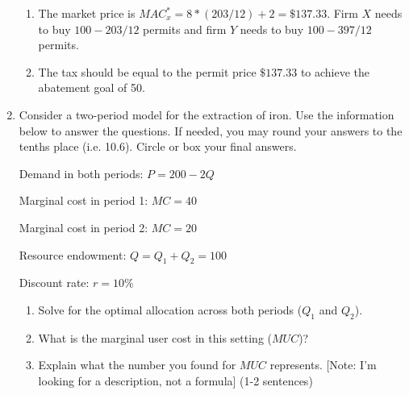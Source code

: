 \documentclass[11pt]{article}
\newcommand{\answer}[1]{\iftoggle{INCLUDEANSWERS}{{\color{violet!70!white}\textbf{Solution:} #1}}{}}
\newcommand{\points}[1]{\iftoggle{INCLUDEPOINTS}{{\color{blue!70!white}(#1 pts.)}}{}}
\begin{document}
\begin{enumerate}
{\begin{enumerate}
      \item The market price is $MAC_x^* = 8 * (203/12) + 2 = \$ 137.33$. Firm $X$ needs to buy $100 - 203/12$ permits and firm $Y$ needs to buy $100 - 397/12$ permits.
      
      \item The tax should be equal to the permit price $\$ 137.33$ to achieve the abatement goal of 50. 
    \end{enumerate}
  }

  \item Consider a two-period model for the extraction of iron. Use the information below to answer the questions. If needed, you may round your answers to the tenths place (i.e. 10.6). Circle or box your final answers.

  Demand in both periods: $P = 200 - 2Q$
  
  Marginal cost in period 1: $MC = 40$
  
  Marginal cost in period 2: $MC = 20$
  
  Resource endowment: $Q = Q_1 + Q_2 = 100$
  
  Discount rate: $r = 10\%$
  
  \begin{enumerate}
    \item \points{15} Solve for the optimal allocation across both periods ($Q_1$ and $Q_2$).
    \item \points{5} What is the marginal user cost in this setting ($MUC$)?
    \item \points{10} Explain what the number you found for $MUC$ represents. [Note: I’m looking for a description, not a formula] (1-2 sentences)  
  \end{enumerate}

  \answer{
    \begin{enumerate}
      \item $MNB_1 = 200 - 2Q_1 - 40 = 160 - 2Q_1$ and $PV(MNB_2) = \frac{200 - 2Q_2 - 20}{1.1} = 180/1.1 - 2/1.1 Q_2$
      
      Then, putting $160 - 2Q_1 = \frac{180 - 2 Q_2}{1.1}$ and $Q_1 + Q_2 = 100$ yields  
      $$
        160 - 2(100 - Q_2) = \frac{180 - 2 Q_2}{1.1}.
      $$
      Simplifying, we have
      $$
        -40 + 2Q_2 = \frac{180 - 2Q_2}{1.1} \implies = -44 + 2.2Q_2 = 180 - 2Q_2.
      $$
      Solving this yields, 
      $$
        Q_2^* = 53.33 \text{ and } Q_1^* = 46.67.
      $$

      \item $MUC = MNB_1(Q_1^*) = 160 - 2Q_1^* = 160 - 2 * 46.67 = 66.66 = PV(MNB_2(Q_2^*))$. 
      
      \item If the miner could have one more unit of iron, it would be worth \$66.66 dollars. That is the most the miner would pay to access one additional unit of the resource.
    \end{enumerate}
  }
\end{enumerate}
\end{document}
